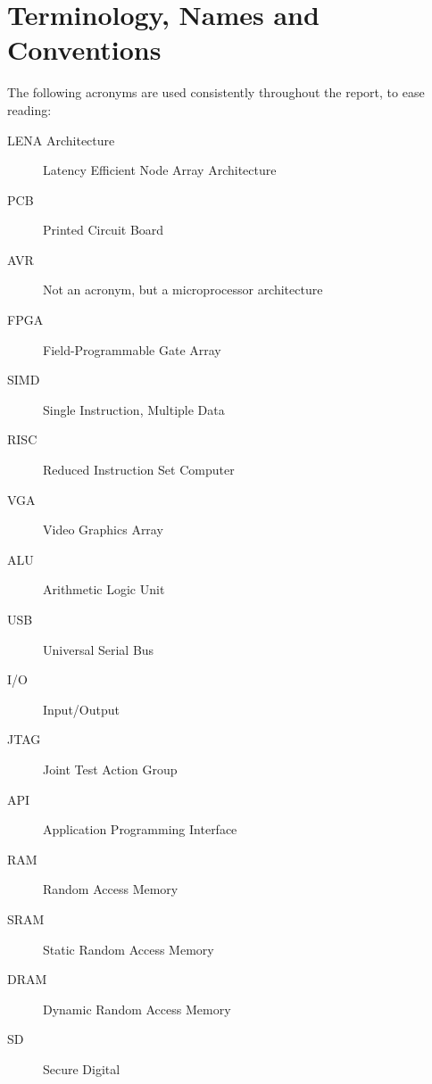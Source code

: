 \section{Terminology, Names and Conventions}
The following acronyms are used consistently throughout the report, to ease
reading: 

\begin{description}
\item[LENA Architecture] Latency Efficient Node Array Architecture
\end{description}

\begin{description}
\item[PCB] Printed Circuit Board
\item[AVR] Not an acronym, but a microprocessor architecture
\item[FPGA] Field-Programmable Gate Array
\item[SIMD] Single Instruction, Multiple Data 
\item[RISC] Reduced Instruction Set Computer
\item[VGA] Video Graphics Array
\item[ALU] Arithmetic Logic Unit
\item[USB] Universal Serial Bus
\item[I/O] Input/Output
\item[JTAG] Joint Test Action Group
\item[API] Application Programming Interface
\item[RAM] Random Access Memory
\item[SRAM] Static Random Access Memory
\item[DRAM] Dynamic Random Access Memory
\item[SD] Secure Digital
\end{description}
